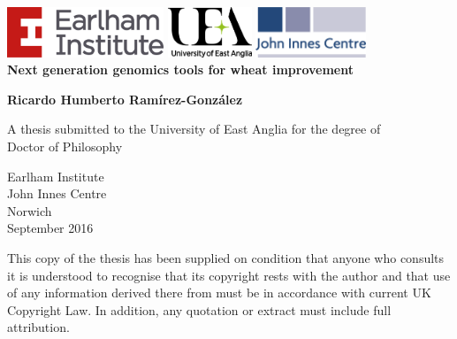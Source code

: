 \begin{titlepage}
    \begin{center}
        
        \includegraphics[height=1.5cm]{EINoSlogan.png}\hfill
        \includegraphics[height=1.5cm]{UEA_NEW_BRAND_Green.png}\hfill
         \includegraphics[height=1.5cm]{jic-logo.png} \\

        \vfill
        \Huge
        \textbf{Next generation genomics tools for wheat improvement}
       

        \LARGE
        
        \vspace{2cm}
        \textbf{Ricardo Humberto Ramírez-González}
        
 
        \vspace{2cm}
        \normalsize
        A thesis submitted to the University of East Anglia for the degree of \\Doctor of Philosophy

        
        
         \vfill 
        Earlham Institute \\ 
        John Innes Centre \\ 
        Norwich \\
        September 2016 \\
        
                
       \vspace{1.5cm}
    \end{center}
    \footnotesize
        \textcopyright  This copy of the thesis has been supplied on condition that anyone who consults it is understood to recognise that its copyright rests with the author and that use of any information derived there from must be in accordance with current UK Copyright Law. In addition, any quotation or extract must include full attribution.
\end{titlepage}